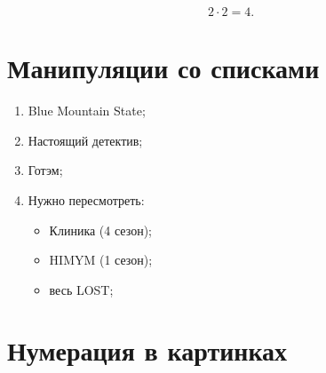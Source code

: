 \documentclass[12pt, a4paper]{article}  %
\begin{document}
\begin{equation}
2 \cdot 2 = 4.
\end{equation}


\section{Манипуляции со списками} 


\renewcommand{\labelenumi}{   (  \asbuk{enumi}   ]   }
\renewcommand{\labelitemi}{  $\sigma$  }

\begin{enumerate}
	\item  Blue Mountain State;
	\item  Настоящий детектив;
	\item  Готэм;
	\item  Нужно пересмотреть: 
		\begin{itemize}
			\item  Клиника (4 сезон);
			\item  HIMYM (1 сезон);
			\item  весь LOST;
		\end{itemize}	
\end{enumerate}


\section{Нумерация в картинках} 

\end{document}
